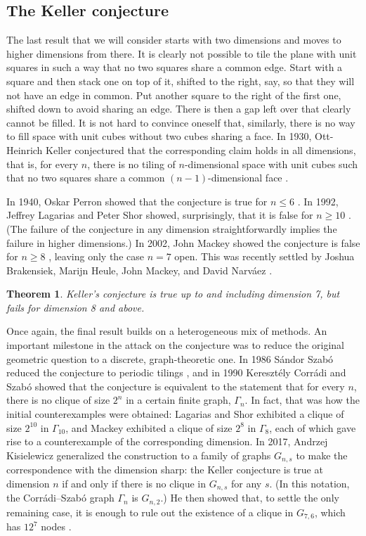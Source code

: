 \documentclass[12pt]{amsart}
\newtheorem{theorem}{Theorem}[section]
\theoremstyle{definition}
\theoremstyle{remark}
\numberwithin{equation}{section}
\begin{document}
\subsection{The Keller conjecture}

The last result that we will consider starts with two dimensions and moves to higher dimensions from there. It is clearly not possible to tile the plane with unit squares in such a way that no two squares share a common edge. Start with a square and then stack one on top of it, shifted to the right, say, so that they will not have an edge in common. Put another square to the right of the first one, shifted down to avoid sharing an edge. There is then a gap left over that clearly cannot be filled. It is not hard to convince oneself that, similarly, there is no way to fill space with unit cubes without two cubes sharing a face. In 1930, Ott-Heinrich Keller conjectured that the corresponding claim holds in all dimensions, that is, for every $n$, there is no tiling of $n$-dimensional space with unit cubes such that no two squares share a common $(n-1)$-dimensional face \cite{keller:30}.

In 1940, Oskar Perron showed that the conjecture is true for $n \le 6$ \cite{perron:40a,perron:40b}. In 1992, Jeffrey Lagarias and Peter Shor showed, surprisingly, that it is false for $n \ge 10$ \cite{lagarias:shor:92}. (The failure of the conjecture in any dimension straightforwardly implies the failure in higher dimensions.) In 2002, John Mackey showed the conjecture is false for $n \ge 8$ \cite{mackey:02}, leaving only the case $n = 7$ open. This was recently settled by Joshua Brakensiek, Marijn Heule, John Mackey, and David Narv\'aez \cite{brakensiek:et:al:20}.

\begin{theorem}
\label{theorem:keller}
Keller's conjecture is true up to and including dimension 7, but fails for dimension 8 and above.
\end{theorem}

Once again, the final result builds on a heterogeneous mix of methods. An important milestone in the attack on the conjecture was to reduce the original geometric question to a discrete, graph-theoretic one. In 1986 S\'andor Szab\'o reduced the conjecture to periodic tilings \cite{szabo:86}, and in 1990 Kereszt\'ely Corr\'adi and Szab\'o showed that the conjecture is equivalent to the statement that for every $n$, there is no clique of size $2^n$ in a certain finite graph, $\Gamma_n$. In fact, that was how the initial counterexamples were obtained: Lagarias and Shor exhibited a clique of size $2^{10}$ in $\Gamma_{10}$, and Mackey exhibited a clique of size $2^8$ in $\Gamma_{8}$, each of which gave rise to a counterexample of the corresponding dimension. In 2017, Andrzej Kisielewicz generalized the construction to a family of graphs $G_{n, s}$ to make the correspondence with the dimension sharp: the Keller conjecture is true at dimension $n$ if and only if there is no clique in $G_{n, s}$ for any $s$. (In this notation, the Corr\'adi--Szab\'o graph $\Gamma_n$ is $G_{n, 2}$.) He then showed that, to settle the only remaining case, it is enough to rule out the existence of a clique in $G_{7, 6}$, which has $12^7$ nodes \cite{kisielewicz:17}.
\end{document}
